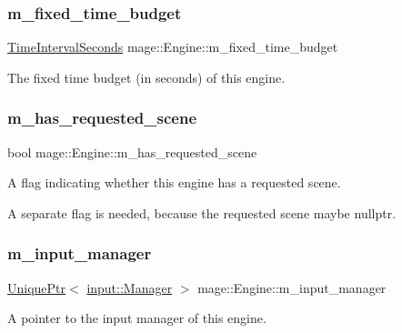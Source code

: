 \subsubsection{\texorpdfstring{m\+\_\+fixed\+\_\+time\+\_\+budget}{m\_fixed\_time\_budget}}
{\footnotesize\ttfamily \mbox{\hyperlink{namespacemage_a21c3d1575018d1e0720948713c76be1f}{Time\+Interval\+Seconds}} mage\+::\+Engine\+::m\+\_\+fixed\+\_\+time\+\_\+budget\hspace{0.3cm}{\ttfamily [private]}}

The fixed time budget (in seconds) of this engine. \mbox{\label{classmage_1_1_engine_a96089c745442208679ea2e18cc6a6097}} 
\subsubsection{\texorpdfstring{m\+\_\+has\+\_\+requested\+\_\+scene}{m\_has\_requested\_scene}}
{\footnotesize\ttfamily bool mage\+::\+Engine\+::m\+\_\+has\+\_\+requested\+\_\+scene\hspace{0.3cm}{\ttfamily [private]}}

A flag indicating whether this engine has a requested scene.

A separate flag is needed, because the requested scene maybe {\ttfamily nullptr}. \mbox{\label{classmage_1_1_engine_a33db04e6d27802054769ff6a30911261}} 
\subsubsection{\texorpdfstring{m\+\_\+input\+\_\+manager}{m\_input\_manager}}
{\footnotesize\ttfamily \mbox{\hyperlink{namespacemage_a3316d7143a973e37adf1110f2e80ca31}{Unique\+Ptr}}$<$ \mbox{\hyperlink{classmage_1_1input_1_1_manager}{input\+::\+Manager}} $>$ mage\+::\+Engine\+::m\+\_\+input\+\_\+manager\hspace{0.3cm}{\ttfamily [private]}}

A pointer to the input manager of this engine. \mbox{\label{classmage_1_1_engine_a8359f22543fa6e39c948411e3023c397}} 
